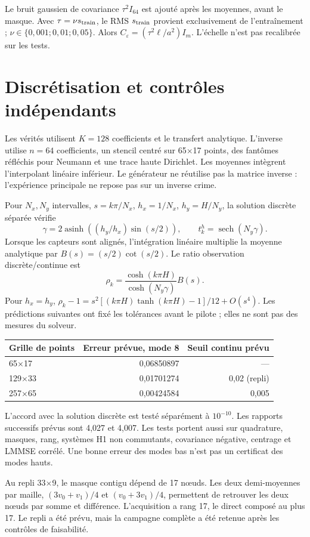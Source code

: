 \documentclass[11pt,a4paper]{article}
\newcommand{\sech}{\operatorname{sech}}
\begin{document}
Le bruit gaussien de covariance $\tau^2I_{64}$ est ajouté après les moyennes, avant le masque. Avec $\tau=\nu s_{\rm train}$, le RMS $s_{\rm train}$ provient exclusivement de l'entraînement ; $\nu\in\{0,001;0,01;0,05\}$. Alors $C_\varepsilon=(\tau^2\ell/a^2)I_m$. L'échelle n'est pas recalibrée sur les tests.
\clearpage

\section{Discrétisation et contrôles indépendants}
Les vérités utilisent $K=128$ coefficients et le transfert analytique. L'inverse utilise $n=64$ coefficients, un stencil centré sur 65$\times$17 points, des fantômes réfléchis pour Neumann et une trace haute Dirichlet. Les moyennes intègrent l'interpolant linéaire inférieur. Le générateur ne réutilise pas la matrice inverse : l'expérience principale ne repose pas sur un inverse crime.

Pour $N_x,N_y$ intervalles, $s=k\pi/N_x$, $h_x=1/N_x$, $h_y=H/N_y$, la solution discrète séparée vérifie
\[
\gamma=2\operatorname{asinh}((h_y/h_x)\sin(s/2)),\qquad t_k^h=\sech(N_y\gamma).
\]
Lorsque les capteurs sont alignés, l'intégration linéaire multiplie la moyenne analytique par $B(s)=(s/2)\cot(s/2)$. Le ratio observation discrète/continue est
\[
\rho_k=\frac{\cosh(k\pi H)}{\cosh(N_y\gamma)}B(s).
\]
Pour $h_x=h_y$, $\rho_k-1=s^2[(k\pi H)\tanh(k\pi H)-1]/12+O(s^4)$. Les prédictions suivantes ont fixé les tolérances avant le pilote ; elles ne sont pas des mesures du solveur.
\begin{center}\begin{tabular}{lrr}\toprule
Grille de points & Erreur prévue, mode 8 & Seuil continu prévu\\\midrule
65$\times$17 & 0,06850897 & ---\\
129$\times$33 & 0,01701274 & 0,02 (repli)\\
257$\times$65 & 0,00424584 & 0,005\\\bottomrule
\end{tabular}\end{center}
L'accord avec la solution discrète est testé séparément à $10^{-10}$. Les rapports successifs prévus sont 4,027 et 4,007. Les tests portent aussi sur quadrature, masques, rang, systèmes H1 non commutants, covariance négative, centrage et LMMSE corrélé. Une bonne erreur des modes bas n'est pas un certificat des modes hauts.

Au repli 33$\times$9, le masque contigu dépend de 17 nœuds. Les deux demi-moyennes par maille, $(3v_0+v_1)/4$ et $(v_0+3v_1)/4$, permettent de retrouver les deux nœuds par somme et différence. L'acquisition a rang 17, le direct composé au plus 17. Le repli a été prévu, mais la campagne complète a été retenue après les contrôles de faisabilité.
\end{document}
